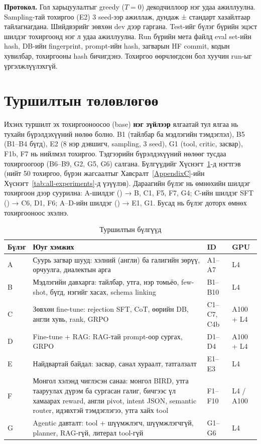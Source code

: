 \textbf{Протокол.} Гол харьцуулалтыг greedy ($T = 0$) декодчиллоор нэг удаа ажиллуулна. Sampling-тай тохиргоо (E2) 3 seed-ээр ажиллаж,
дундаж ± стандарт хазайлтаар тайлагнагдана. Шийдвэрийг зөвхөн dev дээр гаргана. Test-ийг бүлэг бүрийн эцэст шилдэг
тохиргоонд нэг л удаа ажиллуулна. Run бүрийн мета файлд eval set-ийн hash, DB-ийн fingerprint, prompt-ийн hash,
загварын HF commit, кодын хувилбар, тохиргооны hash бичигдэнэ. Тохиргоо өөрчлөгдсөн бол хуучин run-ыг
үргэлжлүүлэхгүй.

\section{Туршилтын төлөвлөгөө}
\label{sec:plan}

Ихэнх туршилт эх тохиргооноосоо (base) \textbf{нэг зүйлээр} ялгаатай тул ялгаа нь тухайн бүрэлдэхүүний нөлөө болно.
B1 (тайлбар ба мэдлэгийн тэмдэглэл), B5 (B1--B4 бүгд), E2 (8 нэр дэвшигч, sampling, 3 seed), G1 (tool, critic, засвар),
F1b, F7 нь нийлмэл тохиргоо. Тэдгээрийн бүрэлдэхүүний нөлөөг тусдаа тохиргоогоор (B6--B9, G2, G5, G6) салгана.
Бүлгүүдийг Хүснэгт~\ref{tab:plan}-д нэгтгэв (нийт 50 тохиргоо, бүрэн жагсаалтыг Хавсралт~\ref{AppendixC}-ийн
Хүснэгт~\ref{tab:all-experiments}-д үзүүлэв). Дараагийн бүлэг нь өмнөхийн шилдэг тохиргоон дээр суурилна:
A-шилдэг () → B, C1, F5, F7, G4; C-ийн шилдэг SFT () → C6, D1, F6; A--D-ийн шилдэг
() → E1, G1. Бусад нь бүлэг доторх өмнөх тохиргооноос эхэлнэ.

\begin{table}[H]
\centering\small
\caption{Туршилтын бүлгүүд}
\label{tab:plan}
\begin{tabularx}{\textwidth}{p{1.0cm}X p{3.3cm} p{2.0cm}}
\toprule
Бүлэг & Юуг хэмжих & ID & GPU \\
\midrule
A & Суурь загвар шууд: хэлний (англи) ба галигийн зөрүү, орчуулга, диалектын арга & A1--A7 & L4 \\
B & Мэдлэгийн давхарга: тайлбар, утга, нэр томьёо, few-shot, бүгд, нэгийг хасах, schema linking & B1--B10 & L4 \\
C & Зөвхөн fine-tune: rejection SFT, CoT, өөрийн DB, англи хувь, rank, GRPO & C1--C7, C4b & A100 + L4 \\
D & Fine-tune + RAG: RAG-тай prompt-оор сургах, GRPO & D1--D4 & A100 + L4 \\
E & Найдвартай байдал: засвар, санал хураалт, татгалзалт & E1--E3 & L4 \\
F & Монгол хэлэнд чиглэсэн санаа: монгол BIRD, утга тааруулах дүрэм ба сургасан галиг, бичгээс үл хамаарах
    reward, англи pivot, intent JSON, semantic router, идэвхтэй тэмдэглэгээ, утга хайх tool & F1--F10 & L4 / A100 \\
G & Agentic давталт: tool + шүүмжлэгч, шүүмжлэгчгүй, planner, RAG-гүй, литерал tool-гүй & G1--G6 & L4 \\
\bottomrule
\end{tabularx}
\end{table}

